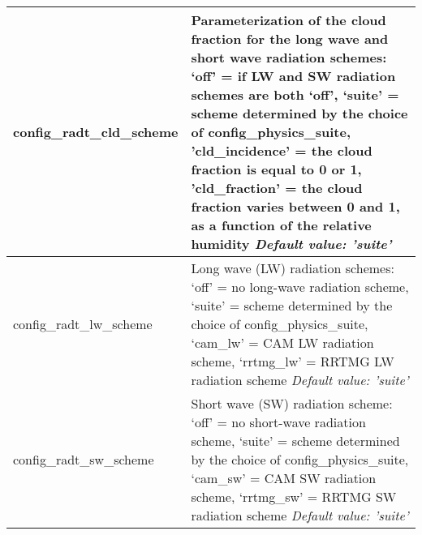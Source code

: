 {\begin{longtable}{|p{2.0in} |p{4.25in}|}
  config\_radt\_cld\_scheme & Parameterization of the cloud fraction for the long wave and short wave radiation schemes: \newline
                                              `off' = if LW and SW radiation schemes are both `off', \newline
                                              `suite'  = scheme determined by the choice of config\_physics\_suite, \newline
                                              'cld\_incidence' = the cloud fraction is equal to 0 or 1, \newline
                                              'cld\_fraction' = the cloud fraction varies between 0 and 1,  as a function of the relative humidity \newline
   {\em Default value: 'suite'} \\ \hline

  config\_radt\_lw\_scheme & Long wave (LW) radiation schemes: \newline
                                             `off' = no long-wave radiation scheme, \newline
                                             `suite'  = scheme determined by the choice of config\_physics\_suite, \newline
                                             `cam\_lw' = CAM LW radiation scheme, \newline 
                                             `rrtmg\_lw' = RRTMG LW radiation scheme \newline
  {\em Default value: 'suite'} \\ \hline

  config\_radt\_sw\_scheme & Short wave (SW) radiation scheme: \newline
                                             `off' = no short-wave radiation scheme, \newline
                                             `suite'  = scheme determined by the choice of config\_physics\_suite, \newline
                                             `cam\_sw' = CAM SW radiation scheme, \newline
                                             `rrtmg\_sw' = RRTMG SW radiation scheme \newline                                                                                           
  {\em Default value: 'suite'} \\ \hline


\end{longtable}}
